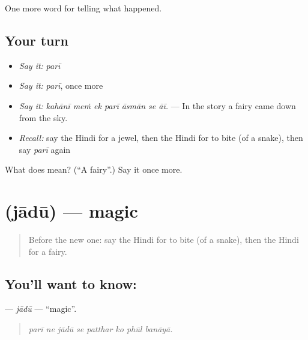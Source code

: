\begin{grammarlens}[title={What you've built}]
One more word for telling what happened.
\end{grammarlens}

\subsection*{Your turn}
\begin{itemize}
\raggedright
  \item \emph{Say it:} \emph{parī}
  \item \emph{Say it:} \emph{parī}, once more
  \item \emph{Say it:} \emph{kahānī meṁ ek parī āsmān se āī.} — In the story a fairy came down from the sky.
  \item \emph{Recall:} say the Hindi for a jewel, then the Hindi for to bite (of a snake), then say \emph{parī} again
\end{itemize}

\begin{tcolorbox}[breakable,colback=teal!4,colframe=teal!35!black,title={Before you move on}]
What does  mean? (\textquotedblleft{}A fairy\textquotedblright{}.) Say it once more.
\end{tcolorbox}
\section[\texorpdfstring{\hi{जादू} (jādū)}{जादू (jādū)}]{ (jādū) — magic}

\label{lesson:HI-C338-jadu}



\begin{quote}
Before the new one: say the Hindi for to bite (of a snake), then the Hindi for a fairy.
\end{quote}

\subsection*{You'll want to know: }
\textbf{} — \emph{jādū} — \textquotedblleft{}magic\textquotedblright{}.

\begin{quote}
       
\end{quote}

\begin{quote}
\emph{parī ne jādū se patthar ko phūl banāyā.}
\end{quote}

